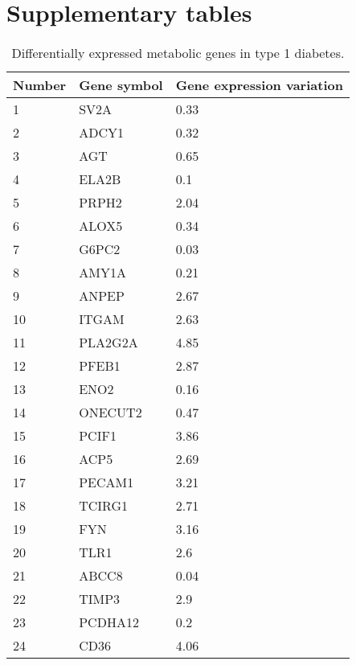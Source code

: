 \section{Supplementary tables}
\begin{table}[h]
\caption[Differentially expressed metabolic genes in type 1 diabetes.]{Differentially expressed metabolic genes in type 1 diabetes.}
\begin{center}
	\begin{tabular*}{\textwidth}{l @{\extracolsep{\fill}} ll}
	\hline
	Number & Gene symbol  & Gene expression variation        \\ 
	\hline
	1      & SV2A         & 0.33       \\
	2      & ADCY1        & 0.32        \\
	3      & AGT          & 0.65        \\
	4      & ELA2B        & 0.1        \\
    5      & PRPH2        & 2.04       \\
	6      & ALOX5        & 0.34        \\
	7      & G6PC2        & 0.03        \\
	8      & AMY1A        & 0.21        \\
	9      & ANPEP        & 2.67       \\
	10      & ITGAM       & 2.63        \\
	11      & PLA2G2A     & 4.85        \\
	12      & PFEB1       & 2.87        \\
	13      & ENO2        & 0.16       \\
	14      & ONECUT2     & 0.47        \\
	15      & PCIF1       & 3.86        \\
	16      & ACP5        & 2.69        \\
	17      & PECAM1      & 3.21       \\
	18      & TCIRG1      & 2.71        \\
	19      & FYN         & 3.16        \\
	20      & TLR1        & 2.6        \\
	21      & ABCC8       & 0.04       \\
	22      & TIMP3       & 2.9        \\
	23      & PCDHA12     & 0.2        \\
	24      & CD36        & 4.06        \\
	\hline
	\end{tabular*}
\end{center}
\label{GIM:tbls1}%
\end{table}


